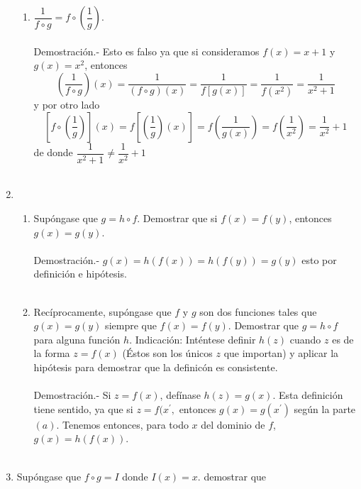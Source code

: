 \begin{enumerate}[\bfseries 1.]
\begin{enumerate}[\bfseries (a)]
		\item $\dfrac{1}{f \circ g} = f \circ \left( \dfrac{1}{g}\right).$\\\\
		    Demostración.-\;  Esto es falso ya que si consideramos $f(x)=x+1$ y $g(x)=x^2$, entonces 
		    $$\left( \dfrac{1}{f \circ g}\right) (x) = \dfrac{1}{(f\circ g)(x)} = \dfrac{1}{f\left[ g(x) \right]} = \dfrac{1}{f(x^2)} = \dfrac{1}{x^2+1}$$ y por otro lado 
		    $$\left[f\circ \left( \dfrac{1}{g}\right)\right](x)  = f\left[ \left( \dfrac{1}{g}\right) (x)\right] = f\left( \dfrac{1}{g(x)}\right) = f \left( \dfrac{1}{x^2}\right)= \dfrac{1}{x^2} + 1$$ 
		    de  donde $\dfrac{1}{x^2 + 1} \neq \dfrac{1}{x^2} + 1$\\\\

	    \end{enumerate}

	\item  
	\begin{enumerate}[\bfseries (a)]
	    
	    \item Supóngase que $g=h \circ f$. Demostrar que si $f(x)=f(y)$, entonces $g(x)=g(y)$.\\\\
		Demostración.-\;  $g(x)=h\left(f(x)\right) =h\left(f(y)\right) = g(y) $ esto por definición  e hipótesis.\\\\ 
	    
	    \item Recíprocamente, supóngase que $f$ y $g$ son dos funciones tales que $g(x)=g(y)$ siempre que $f(x)=f(y)$. Demostrar que $g = h\circ f$ para alguna función $h$. Indicación: Inténtese definir $h(z)$ cuando $z$ es de la forma $z=f(x)$ (Éstos son los únicos $z$ que importan) y aplicar la hipótesis para demostrar que la definicón es consistente.\\\\
		Demostración.-\; Si $z=f(x)$, defínase $h(z)=g(x)$. Esta definición tiene sentido, ya que si $z=f(x^{'},$ entonces $g(x)=g(x^{'})$ según la parte $(a)$. Tenemos entonces, para todo $x$ del dominio de $f$, $g(x)=h(f(x))$.\\\\

	\end{enumerate}

	\item Supóngase que $f\circ g = I$ donde $I(x)=x$. demostrar que 


\end{enumerate}
